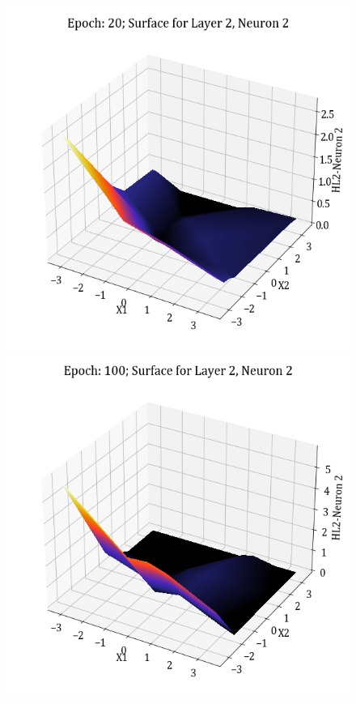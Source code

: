 \documentclass[11pt,a4paper]{article}
\begin{document}
\begin{figure}[H]
    \includegraphics[scale=0.4]{images/1B_MLFFNN_E20_HL2_N2.png}
    \includegraphics[scale=0.4]{images/1B_MLFFNN_E100_HL2_N2.png}

\end{figure}
\end{document}
